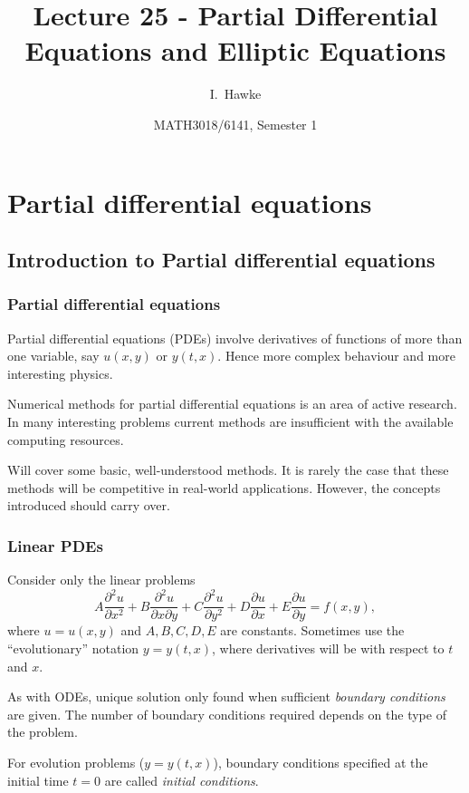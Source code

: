 \documentclass{beamer}
\title[Lecture 25] %
{Lecture 25 - Partial Differential Equations and Elliptic Equations}
\author[I. Hawke] %
{I.~Hawke}
\institute[University of Southampton] %
{
  School of Mathematics, \\
  University of Southampton, UK
}
\date[Semester 1] %
{MATH3018/6141, Semester 1}
\newcommand{\pda}[2]{\frac{\partial{#1}}{\partial{#2}}}
\newcommand{\pdb}[2]{\frac{\partial^2{#1}}{\partial{#2}^2}}
\newcommand{\pdc}[3]{\frac{\partial^2{#1}}{\partial{#2}\partial{#3}}}
\begin{document}
\begin{frame}
  \titlepage
\end{frame}

\section{Partial differential equations}

\subsection{Introduction to Partial differential equations}

\begin{frame}
  \frametitle{Partial differential equations}

  Partial differential equations (PDEs) involve derivatives of
  functions of more than one variable, say $u(x, y)$ or $y(t,
  x)$. Hence more complex behaviour and more interesting
  physics. \pause

  \vspace{1ex}

  Numerical methods for partial differential equations is an area of
  active research. In many interesting problems current methods are
  insufficient with the available computing resources. \pause

  \vspace{1ex}

  Will cover some basic, well-understood methods. It is rarely the
  case that these methods will be competitive in real-world
  applications. However, the concepts introduced should carry over.

\end{frame}

\begin{frame}
  \frametitle{Linear PDEs}

  Consider only the linear problems
  \begin{equation*}
    A \pdb{u}{x} + B \pdc{u}{x}{y} + C \pdb{u}{y} + D \pda{u}{x} + E
    \pda{u}{y} = f(x, y),
  \end{equation*}
  where $u = u(x, y)$ and $A,B,C,D,E$ are constants. \pause Sometimes
  use the ``evolutionary'' notation $y = y(t, x)$, where derivatives
  will be with respect to $t$ and $x$. \pause

  \vspace{1ex}

  As with ODEs, unique solution only found when sufficient
  \emph{boundary conditions} are given. The number of boundary
  conditions required depends on the type of the problem. \pause

  \vspace{1ex}

  For evolution problems ($y = y(t,x)$), boundary conditions specified
  at the initial time $t=0$ are called \emph{initial conditions}.

\end{frame}
\end{document}
